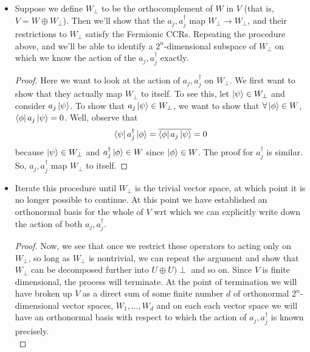 \documentclass{book}
\theoremstyle{definition}
\newcommand{\al}{\alpha}
\begin{document}
\begin{itemize}
\begin{proof}
\begin{itemize}
		\item Suppose $\al_j=1$. Then $a_j^\dagger\ket{\al} =0$. 
	\end{itemize} 
	\end{proof}
	
	
	\item Suppose we define $W_\perp$ to be the orthocomplement of $W$ in $V$ (that is, $V = W \oplus W_\perp$). Then we'll show that the $a_j,a_j^\dagger$ map $W_\perp \to W_\perp$, and their restrictions to $W_\perp$ satisfy the Fermionic CCRs.  Repeating the procedure above, and we'll be able to identify a $2^n$-dimensional subspace of $W_\perp$ on which we know the action of the $a_j,a_j^\dagger$ exactly.
	
	\begin{proof}
		Here we want to look at the action of $a_j,a_j^\dagger$ on $W_\perp$. We first want to show that they actually map $W_\perp$ to itself. To see this, let $\ket{\psi}\in W_\perp$ and consider $a_j\ket{\psi}$. To show that $a_j\ket{\psi}\in W_\perp$, we want to show that $\forall \ket{\phi}\in W$, $\bra{\phi}a_j\ket{\psi} =0$. Well, observe that
		\begin{equation}
		\bra{\psi}a_j^\dagger \ket{\phi} = \overline{\bra{\phi}a_j\ket{\psi}} =0
		\end{equation}
		because $\ket{\psi}\in W_\perp$ and $a_j^\dagger \ket{\phi}\in W$ since $\ket{\phi}\in W$. The proof for $a_j^\dagger$ is similar. So, $a_j,a_j^\dagger$ map $W_\perp$ to itself. 
	\end{proof}
	
	
	
	\item Iterate this procedure until $W_\perp$ is the trivial vector space, at which point it is no longer possible to continue. At this point we have established an orthonormal basis for the whole of $V$ wrt which we can explicitly write down the action of both $a_j,a_j^\dagger$.
	
	\begin{proof}
		Now, we see that once we restrict these operators to acting only on $W_\perp$, so long as $W_\perp$ is nontrivial, we can repeat the argument and show that $W_\perp$ can be decomposed further into $U\oplus U)\perp$ and so on. Since $V$ is finite dimensional, the process will terminate. At the point of termination we will have broken up $V$ as a direct sum of some finite number $d$ of orthonormal $2^n$-dimensional vector spaces, $W_1,\dots,W_d$ and on each each vector space we will have an orthonormal basis with respect to which the action of $a_j,a_j^\dagger$ is known precisely.\\
		

\end{proof}
\end{itemize}
\end{document}
